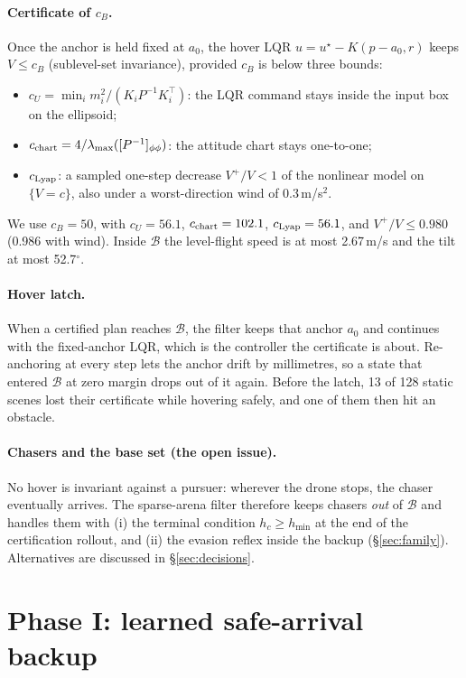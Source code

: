 \documentclass[11pt]{article}
\newcommand{\Base}{\mathcal{B}}
\begin{document}
\paragraph{Certificate of $c_B$.}
Once the anchor is held fixed at $a_0$, the hover LQR $u=u^\star-K(p-a_0,r)$ keeps $V\le c_B$ (sublevel-set invariance), provided $c_B$ is below three bounds:
\begin{itemize}
\item $c_U=\min_i m_i^2/(K_iP^{-1}K_i^\top)$: the LQR command stays inside the input box on the ellipsoid;
\item $c_{\rm chart}=4/\lambda_{\max}([P^{-1}]_{\phi\phi})$: the attitude chart stays one-to-one;
\item $c_{\rm Lyap}$: a sampled one-step decrease $V^+/V<1$ of the nonlinear model on $\{V=c\}$, also under a worst-direction wind of 0.3\,m/s$^2$.
\end{itemize}
We use $c_B=50$, with $c_U=56.1$, $c_{\rm chart}=102.1$, $c_{\rm Lyap}=56.1$, and $V^+/V\le0.980$ (0.986 with wind).
Inside $\Base$ the level-flight speed is at most 2.67\,m/s and the tilt at most 52.7$^\circ$.

\paragraph{Hover latch.}
When a certified plan reaches $\Base$, the filter keeps that anchor $a_0$ and continues with the fixed-anchor LQR, which is the controller the certificate is about.
Re-anchoring at every step lets the anchor drift by millimetres, so a state that entered $\Base$ at zero margin drops out of it again.
Before the latch, 13 of 128 static scenes lost their certificate while hovering safely, and one of them then hit an obstacle.

\paragraph{Chasers and the base set (the open issue).}
No hover is invariant against a pursuer: wherever the drone stops, the chaser eventually arrives. The sparse-arena filter therefore keeps chasers \emph{out} of $\Base$ and handles them with
(i) the terminal condition $h_c\ge h_{\min}$ at the end of the certification rollout, and (ii) the evasion reflex inside the backup (\S\ref{sec:family}).
Alternatives are discussed in \S\ref{sec:decisions}.

\section{Phase I: learned safe-arrival backup}\label{sec:phase1}
\end{document}
